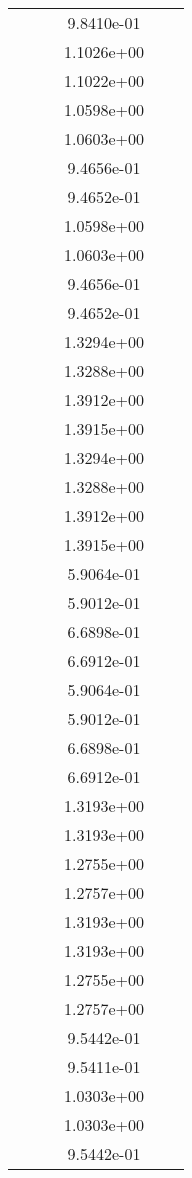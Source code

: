 \begin{xltabular}{\textwidth}{r|rS[table-format=1.3e+2]S[table-format=1.4e+2]S[table-format=1.4e+2]S[table-format=-1.5]}
&  &  & 9.8410e-01 & & \\
&  &  & 1.1026e+00 & & \\
&  &  & 1.1022e+00 & & \\
&  &  & 1.0598e+00 & & \\
&  &  & 1.0603e+00 & & \\
&  &  & 9.4656e-01 & & \\
&  &  & 9.4652e-01 & & \\
&  &  & 1.0598e+00 & & \\
&  &  & 1.0603e+00 & & \\
&  &  & 9.4656e-01 & & \\
&  &  & 9.4652e-01 & & \\
&  &  & 1.3294e+00 & & \\
&  &  & 1.3288e+00 & & \\
&  &  & 1.3912e+00 & & \\
&  &  & 1.3915e+00 & & \\
&  &  & 1.3294e+00 & & \\
&  &  & 1.3288e+00 & & \\
&  &  & 1.3912e+00 & & \\
&  &  & 1.3915e+00 & & \\
&  &  & 5.9064e-01 & & \\
&  &  & 5.9012e-01 & & \\
&  &  & 6.6898e-01 & & \\
&  &  & 6.6912e-01 & & \\
&  &  & 5.9064e-01 & & \\
&  &  & 5.9012e-01 & & \\
&  &  & 6.6898e-01 & & \\
&  &  & 6.6912e-01 & & \\
&  &  & 1.3193e+00 & & \\
&  &  & 1.3193e+00 & & \\
&  &  & 1.2755e+00 & & \\
&  &  & 1.2757e+00 & & \\
&  &  & 1.3193e+00 & & \\
&  &  & 1.3193e+00 & & \\
&  &  & 1.2755e+00 & & \\
&  &  & 1.2757e+00 & & \\
&  &  & 9.5442e-01 & & \\
&  &  & 9.5411e-01 & & \\
&  &  & 1.0303e+00 & & \\
&  &  & 1.0303e+00 & & \\
&  &  & 9.5442e-01 & & \\

\end{xltabular}
